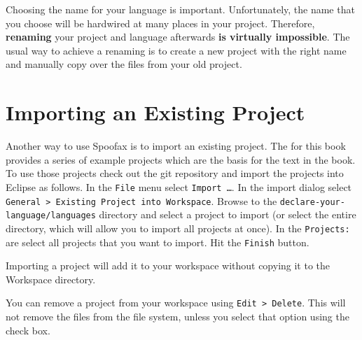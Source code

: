 Choosing the name for your language is important. Unfortunately, the name that
you choose will be hardwired at many places in your project. Therefore,
\textbf{renaming} your project and language afterwards \textbf{is virtually
impossible}.
The usual way to achieve a renaming is to create a new project with the right
name and manually copy over the files from your old project.

\section{Importing an Existing Project}

Another way to use Spoofax is to import an existing project. The
 for this book provides a series of example
projects which are the basis for the text in the book. To use those projects
check out the git repository and import the projects into Eclipse as follows.
In the \texttt{File} menu select \texttt{Import \ldots}. In the import dialog
select \texttt{General > Existing Project into Workspace}. Browse to the
\texttt{declare-your-language/languages} directory and select a project to
import (or select the entire directory, which will allow you to import all
projects at once). In the \texttt{Projects:} are select all projects that you
want to import. Hit the \texttt{Finish} button. 

Importing a project will add it to your workspace without copying it to the
Workspace directory.

You can remove a project from your workspace using \texttt{Edit > Delete}. This
will not remove the files from the file system, unless you select that option
using the check box.





